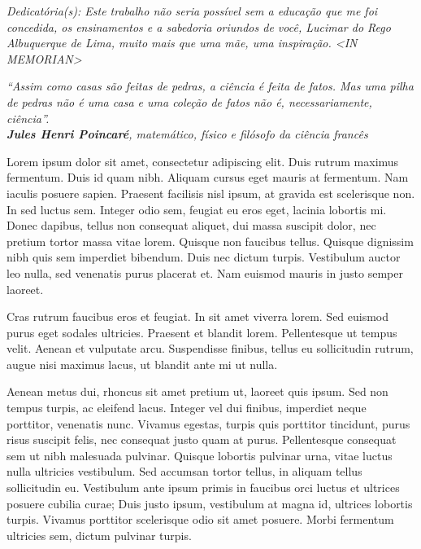 \begin{flushright}
{\em 
Dedicat\'oria(s): Este trabalho não seria possível sem a educação que me foi concedida, os ensinamentos e a sabedoria oriundos de você, Lucimar do Rego Albuquerque de Lima, muito mais que uma mãe, uma inspiração. <IN MEMORIAN>
}
\end{flushright}
\newpage


\cleardoublepage
\thispagestyle{empty}
\vspace*{200mm}

\begin{flushright}
	{\em 
		“Assim como casas são feitas de pedras, a ciência é feita de fatos. Mas uma pilha de pedras não é uma casa e uma coleção de fatos não é, necessariamente, ciência”.  \\ \textbf{Jules Henri Poincaré}, matemático, físico e filósofo da ciência francês
	}
\end{flushright}
\newpage




\hspace{5mm}
Lorem ipsum dolor sit amet, consectetur adipiscing elit. Duis rutrum maximus fermentum. Duis id quam nibh. Aliquam cursus eget mauris at fermentum. Nam iaculis posuere sapien. Praesent facilisis nisl ipsum, at gravida est scelerisque non. In sed luctus sem. Integer odio sem, feugiat eu eros eget, lacinia lobortis mi. Donec dapibus, tellus non consequat aliquet, dui massa suscipit dolor, nec pretium tortor massa vitae lorem. Quisque non faucibus tellus. Quisque dignissim nibh quis sem imperdiet bibendum. Duis nec dictum turpis. Vestibulum auctor leo nulla, sed venenatis purus placerat et. Nam euismod mauris in justo semper laoreet.

Cras rutrum faucibus eros et feugiat. In sit amet viverra lorem. Sed euismod purus eget sodales ultricies. Praesent et blandit lorem. Pellentesque ut tempus velit. Aenean et vulputate arcu. Suspendisse finibus, tellus eu sollicitudin rutrum, augue nisi maximus lacus, ut blandit ante mi ut nulla.

Aenean metus dui, rhoncus sit amet pretium ut, laoreet quis ipsum. Sed non tempus turpis, ac eleifend lacus. Integer vel dui finibus, imperdiet neque porttitor, venenatis nunc. Vivamus egestas, turpis quis porttitor tincidunt, purus risus suscipit felis, nec consequat justo quam at purus. Pellentesque consequat sem ut nibh malesuada pulvinar. Quisque lobortis pulvinar urna, vitae luctus nulla ultricies vestibulum. Sed accumsan tortor tellus, in aliquam tellus sollicitudin eu. Vestibulum ante ipsum primis in faucibus orci luctus et ultrices posuere cubilia curae; Duis justo ipsum, vestibulum at magna id, ultrices lobortis turpis. Vivamus porttitor scelerisque odio sit amet posuere. Morbi fermentum ultricies sem, dictum pulvinar turpis. 

